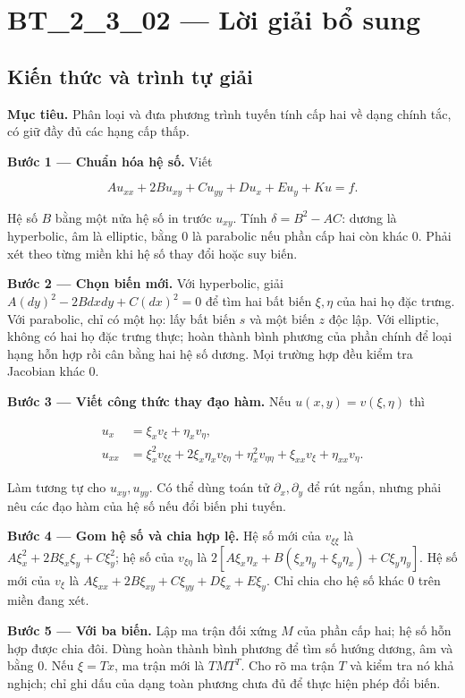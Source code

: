 \documentclass[10pt,a4paper]{article}
\begin{document}
\section*{BT\_2\_3\_02 — Lời giải bổ sung}
\subsection*{Kiến thức và trình tự giải}
\textbf{Mục tiêu.} Phân loại và đưa phương trình tuyến tính cấp hai về dạng chính tắc, có giữ đầy đủ các hạng cấp thấp.

\textbf{Bước 1 — Chuẩn hóa hệ số.} Viết


\[
A u_{xx}+2B u_{xy}+C u_{yy}+D u_x+E u_y+K u=f.
\]


Hệ số $B$ bằng một nửa hệ số in trước $u_{xy}$. Tính $\delta=B^2-AC$: dương là hyperbolic, âm là elliptic, bằng $0$ là parabolic nếu phần cấp hai còn khác $0$. Phải xét theo từng miền khi hệ số thay đổi hoặc suy biến.

\textbf{Bước 2 — Chọn biến mới.} Với hyperbolic, giải $A(dy)^2-2Bdxdy+C(dx)^2=0$ để tìm hai bất biến $\xi,\eta$ của hai họ đặc trưng. Với parabolic, chỉ có một họ: lấy bất biến $s$ và một biến $z$ độc lập. Với elliptic, không có hai họ đặc trưng thực; hoàn thành bình phương của phần chính để loại hạng hỗn hợp rồi cân bằng hai hệ số dương. Mọi trường hợp đều kiểm tra Jacobian khác $0$.

\textbf{Bước 3 — Viết công thức thay đạo hàm.} Nếu $u(x,y)=v(\xi,\eta)$ thì


\[
\begin{aligned}
u_x&=\xi_xv_\xi+\eta_xv_\eta,\\
u_{xx}&=\xi_x^2v_{\xi\xi}+2\xi_x\eta_xv_{\xi\eta}
+\eta_x^2v_{\eta\eta}+\xi_{xx}v_\xi+\eta_{xx}v_\eta.
\end{aligned}
\]


Làm tương tự cho $u_{xy},u_{yy}$. Có thể dùng toán tử $\partial_x,\partial_y$ để rút ngắn, nhưng phải nêu các đạo hàm của hệ số nếu đổi biến phi tuyến.

\textbf{Bước 4 — Gom hệ số và chia hợp lệ.} Hệ số mới của $v_{\xi\xi}$ là $A\xi_x^2+2B\xi_x\xi_y+C\xi_y^2$; hệ số của $v_{\xi\eta}$ là $2[A\xi_x\eta_x+B(\xi_x\eta_y+\xi_y\eta_x)+C\xi_y\eta_y]$. Hệ số mới của $v_\xi$ là $A\xi_{xx}+2B\xi_{xy}+C\xi_{yy}+D\xi_x+E\xi_y$. Chỉ chia cho hệ số khác $0$ trên miền đang xét.

\textbf{Bước 5 — Với ba biến.} Lập ma trận đối xứng $M$ của phần cấp hai; hệ số hỗn hợp được chia đôi. Dùng hoàn thành bình phương để tìm số hướng dương, âm và bằng $0$. Nếu $\xi=T x$, ma trận mới là $TMT^T$. Cho rõ ma trận $T$ và kiểm tra nó khả nghịch; chỉ ghi dấu của dạng toàn phương chưa đủ để thực hiện phép đổi biến.
\end{document}
